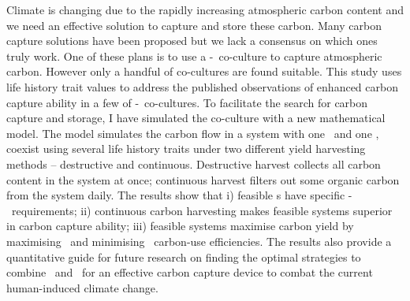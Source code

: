 \documentclass[../thesis.tex]{subfiles} %
\begin{document}
Climate is changing due to the rapidly increasing atmospheric carbon content and we need an effective solution to capture and store these carbon.  Many carbon capture solutions have been proposed but we lack a consensus on which ones truly work.  One of these plans is to use a \phy-\bac\ co-culture to capture atmospheric carbon.  However only a handful of co-cultures are found suitable.  This study uses life history trait values to address the published observations of enhanced carbon capture ability in a few of \phy-\bac\ co-cultures.  To facilitate the search for carbon capture and storage, I have simulated the co-culture with a new mathematical model.  The model simulates the carbon flow in a system with one \phy\ and one \bacm, coexist using several life history traits under two different yield harvesting methods -- destructive and continuous.  Destructive harvest collects all carbon content in the system at once; continuous harvest filters out some organic carbon from the system daily.  The results show that \Rn{1}) feasible \pbs s have specific \phy-\bac\ requirements; \Rn{2}) continuous carbon harvesting makes feasible systems superior in carbon capture ability; \Rn{3}) feasible systems maximise carbon yield by maximising \phy\ and minimising \bac\ carbon-use efficiencies.  The results also provide a quantitative guide for future research on finding the optimal strategies to combine \phy\ and \bac\ for an effective carbon capture device to combat the current human-induced climate change.
\end{document}
